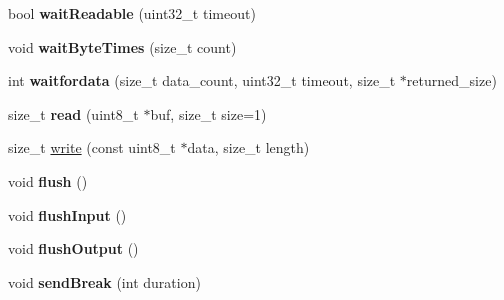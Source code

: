 \begin{DoxyCompactItemize}
\item 
bool {\bfseries wait\+Readable} (uint32\+\_\+t timeout)\hypertarget{classserial_1_1serial_1_1_serial_1_1_serial_impl_a4a26fe12f37fd3e54f778181377cd21a}{}\label{classserial_1_1serial_1_1_serial_1_1_serial_impl_a4a26fe12f37fd3e54f778181377cd21a}

\item 
void {\bfseries wait\+Byte\+Times} (size\+\_\+t count)\hypertarget{classserial_1_1serial_1_1_serial_1_1_serial_impl_acda4ee2cb12938a76b025e53100b32ee}{}\label{classserial_1_1serial_1_1_serial_1_1_serial_impl_acda4ee2cb12938a76b025e53100b32ee}

\item 
int {\bfseries waitfordata} (size\+\_\+t data\+\_\+count, uint32\+\_\+t timeout, size\+\_\+t $\ast$returned\+\_\+size)\hypertarget{classserial_1_1serial_1_1_serial_1_1_serial_impl_a962c37527625ec7fb63ed74cfe53484f}{}\label{classserial_1_1serial_1_1_serial_1_1_serial_impl_a962c37527625ec7fb63ed74cfe53484f}

\item 
size\+\_\+t {\bfseries read} (uint8\+\_\+t $\ast$buf, size\+\_\+t size=1)\hypertarget{classserial_1_1serial_1_1_serial_1_1_serial_impl_ab7a6fbc9aeab91dbec5679c2649f381b}{}\label{classserial_1_1serial_1_1_serial_1_1_serial_impl_ab7a6fbc9aeab91dbec5679c2649f381b}

\item 
size\+\_\+t \hyperlink{classserial_1_1serial_1_1_serial_1_1_serial_impl_adb5572ca568cd0186dec4bc4af28f13b}{write} (const uint8\+\_\+t $\ast$data, size\+\_\+t length)
\item 
void {\bfseries flush} ()\hypertarget{classserial_1_1serial_1_1_serial_1_1_serial_impl_a9cc5d31f66893114cc534da96e3533fd}{}\label{classserial_1_1serial_1_1_serial_1_1_serial_impl_a9cc5d31f66893114cc534da96e3533fd}

\item 
void {\bfseries flush\+Input} ()\hypertarget{classserial_1_1serial_1_1_serial_1_1_serial_impl_acb1b7b1f4a6b088c8a3ada12c878d7a7}{}\label{classserial_1_1serial_1_1_serial_1_1_serial_impl_acb1b7b1f4a6b088c8a3ada12c878d7a7}

\item 
void {\bfseries flush\+Output} ()\hypertarget{classserial_1_1serial_1_1_serial_1_1_serial_impl_a34ad257f3528acda052ef2cb426d8edb}{}\label{classserial_1_1serial_1_1_serial_1_1_serial_impl_a34ad257f3528acda052ef2cb426d8edb}

\item 
void {\bfseries send\+Break} (int duration)\hypertarget{classserial_1_1serial_1_1_serial_1_1_serial_impl_a447258df99a7fad4cb5c4cccb3c1d060}{}\label{classserial_1_1serial_1_1_serial_1_1_serial_impl_a447258df99a7fad4cb5c4cccb3c1d060}


\end{DoxyCompactItemize}
